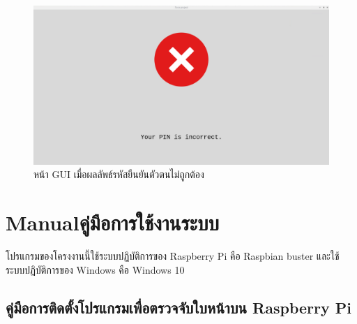 \begin{figure}[!ht]
  \begin{center}
    \includegraphics[scale=.35]{pic/pin_incorrect.png}
    \caption[หน้า GUI เมื่อผลลัพธ์รหัสยืนยันตัวตนไม่ถูกต้อง]{หน้า GUI เมื่อผลลัพธ์รหัสยืนยันตัวตนไม่ถูกต้อง}
    \label{fig:pin_incorrect}
  \end{center}
\end{figure}













\chapter{\ifenglish Manual\else คู่มือการใช้งานระบบ\fi}

โปรแกรมของโครงงานนี้ใช้ระบบปฏิบัติการของ Raspberry Pi คือ Raspbian buster และใช้ระบบปฏิบัติการของ Windows คือ Windows 10

\section{คู่มือการติดตั้งโปรแกรมเพื่อตรวจจับใบหน้าบน Raspberry Pi}
